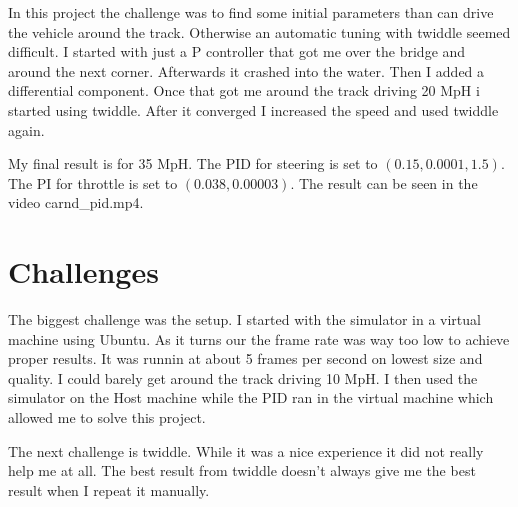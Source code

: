 \documentclass[a4paper, 11pt, DIV=14]{scrartcl}
\begin{document}
In this project the challenge was to find some initial parameters than can drive the vehicle around the track. Otherwise an automatic tuning with twiddle seemed difficult. I started with just a P controller that got me over the bridge and around the next corner. Afterwards it crashed into the water. Then I added a differential component. Once that got me around the track driving 20 MpH i started using twiddle. After it converged I increased the speed and used twiddle again.

My final result is for 35 MpH. The PID for steering is set to $(0.15, 0.0001, 1.5)$. The PI for throttle is set to $(0.038, 0.00003)$. The result can be seen in the video carnd\_pid.mp4. 

\section*{Challenges}
The biggest challenge was the setup. I started with the simulator in a virtual machine using Ubuntu. As it turns our the frame rate was way too low to achieve proper results. It was runnin at about 5 frames per second on lowest size and quality. I could barely get around the track driving 10 MpH. I then used the simulator on the Host machine while the PID ran in the virtual machine which allowed me to solve this project.

The next challenge is twiddle. While it was a nice experience it did not really help me at all. The best result from twiddle doesn't always give me the best result when I repeat it manually. 
\end{document}

